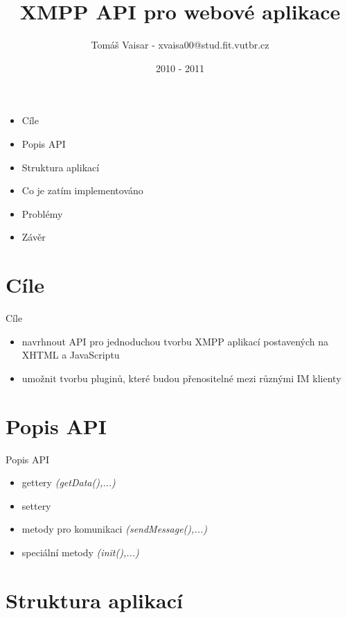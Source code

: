\documentclass[9pt]{beamer}
\title{XMPP API pro webové aplikace}
\author{Tomáš Vaisar - xvaisa00@stud.fit.vutbr.cz}
\institute{FIT VUT v Brně}
\date{2010 - 2011}
\begin{document}
\begin{frame}
\titlepage
\end{frame}

\begin{frame}

	\begin{itemize}
		\item Cíle
		\item Popis API
		\item Struktura aplikací
		\item Co je zatím implementováno
		\item Problémy
		\item Závěr
	\end{itemize}

\end{frame}

\section{Cíle}

\begin{frame}{Cíle}

	\begin{itemize}
		\item navrhnout API pro jednoduchou tvorbu XMPP aplikací postavených na XHTML a JavaScriptu
		\item umožnit tvorbu pluginů, které budou přenositelné mezi různými IM klienty
	\end{itemize}
	
\end{frame}

\section{Popis API}

\begin{frame}{Popis API}
	\begin{itemize}
		\item gettery \textit{(getData(),...)}
		\item settery 
		\item metody pro komunikaci \textit{(sendMessage(),...)}
		\item speciální metody \textit{(init(),...)}
	\end{itemize}
\end{frame}

\section{Struktura aplikací}
\end{document}
